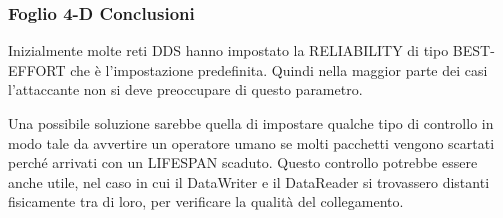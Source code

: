 \subsubsection{Foglio 4-D Conclusioni}
Inizialmente molte reti DDS hanno impostato la RELIABILITY
di tipo BEST-EFFORT che è l'impostazione predefinita. Quindi nella maggior parte
dei casi l'attaccante non si deve preoccupare di questo parametro.

Una possibile soluzione sarebbe quella di impostare qualche tipo di controllo
in modo tale da avvertire un operatore umano se molti pacchetti vengono
scartati perché arrivati con un LIFESPAN scaduto. Questo controllo potrebbe
essere anche utile, nel caso in cui il DataWriter e il DataReader si trovassero
distanti fisicamente tra di loro, per verificare la qualità del collegamento.
\cite{DBLP:conf/malware/MichaudDL18}





\setlength{\arrayrulewidth}{1.0pt} %


